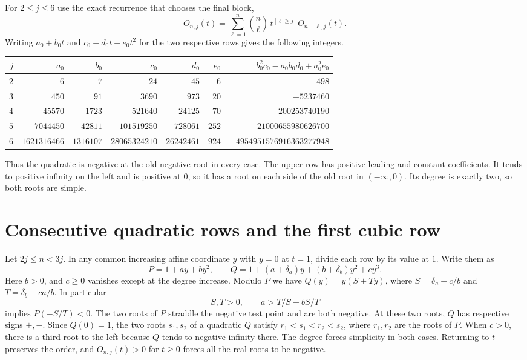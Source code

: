 \documentclass[11pt]{article}
\begin{document}
For \(2\le j\le6\) use the exact recurrence that chooses the final block,
\[
O_{n,j}(t)=\sum_{\ell=1}^n \binom n\ell\,t^{[\ell\ge j]}O_{n-\ell,j}(t).
\]
Writing \(a_0+b_0t\) and \(c_0+d_0t+e_0t^2\) for the two respective rows gives the following integers.

\begin{center}
\footnotesize\setlength{\tabcolsep}{3.8pt}
\begin{tabular}{rrrrrrr}
\hline
$j$ & $a_0$ & $b_0$ & $c_0$ & $d_0$ & $e_0$ & $b_0^2c_0-a_0b_0d_0+a_0^2e_0$ \\
\hline
$2$ & $6$ & $7$ & $24$ & $45$ & $6$ & $-498$ \\
$3$ & $450$ & $91$ & $3690$ & $973$ & $20$ & $-5237460$ \\
$4$ & $45570$ & $1723$ & $521640$ & $24125$ & $70$ & $-200253740190$ \\
$5$ & $7044450$ & $42811$ & $101519250$ & $728061$ & $252$ & $-21000655980626700$ \\
$6$ & $1621316466$ & $1316107$ & $28065324210$ & $26242461$ & $924$ & $-4954951576916363277948$ \\
\hline
\end{tabular}
\end{center}

Thus the quadratic is negative at the old negative root in every case. The upper row has positive leading and constant coefficients. It tends to positive infinity on the left and is positive at \(0\), so it has a root on each side of the old root in \((-\infty,0)\). Its degree is exactly two, so both roots are simple.

\section{Consecutive quadratic rows and the first cubic row}

Let \(2j\le n<3j\). In any common increasing affine coordinate \(y\) with \(y=0\) at \(t=1\), divide each row by its value at \(1\). Write them as
\[
P=1+ay+by^2,\qquad Q=1+(a+\delta_a)y+(b+\delta_b)y^2+cy^3.
\]
Here \(b>0\), and \(c\ge0\) vanishes except at the degree increase. Modulo \(P\) we have \(Q(y)=y(S+Ty)\), where \(S=\delta_a-c/b\) and \(T=\delta_b-ca/b\). In particular
\[
S,T>0,\qquad a>T/S+bS/T
\tag{5}
\]
implies \(P(-S/T)<0\). The two roots of \(P\) straddle the negative test point and are both negative. At these two roots, \(Q\) has respective signs \(+,-\). Since \(Q(0)=1\), the two roots \(s_1,s_2\) of a quadratic \(Q\) satisfy \(r_1<s_1<r_2<s_2\), where \(r_1,r_2\) are the roots of \(P\). When \(c>0\), there is a third root to the left because \(Q\) tends to negative infinity there. The degree forces simplicity in both cases. Returning to \(t\) preserves the order, and \(O_{n,j}(t)>0\) for \(t\ge0\) forces all the real roots to be negative.
\end{document}
